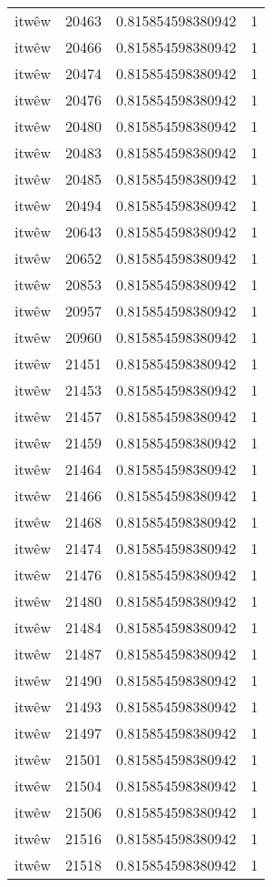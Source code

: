 \begin{longtable}{llll}
itwêw & 20463 & 0.815854598380942 & 1 \\
itwêw & 20466 & 0.815854598380942 & 1 \\
itwêw & 20474 & 0.815854598380942 & 1 \\
itwêw & 20476 & 0.815854598380942 & 1 \\
itwêw & 20480 & 0.815854598380942 & 1 \\
itwêw & 20483 & 0.815854598380942 & 1 \\
itwêw & 20485 & 0.815854598380942 & 1 \\
itwêw & 20494 & 0.815854598380942 & 1 \\
itwêw & 20643 & 0.815854598380942 & 1 \\
itwêw & 20652 & 0.815854598380942 & 1 \\
itwêw & 20853 & 0.815854598380942 & 1 \\
itwêw & 20957 & 0.815854598380942 & 1 \\
itwêw & 20960 & 0.815854598380942 & 1 \\
itwêw & 21451 & 0.815854598380942 & 1 \\
itwêw & 21453 & 0.815854598380942 & 1 \\
itwêw & 21457 & 0.815854598380942 & 1 \\
itwêw & 21459 & 0.815854598380942 & 1 \\
itwêw & 21464 & 0.815854598380942 & 1 \\
itwêw & 21466 & 0.815854598380942 & 1 \\
itwêw & 21468 & 0.815854598380942 & 1 \\
itwêw & 21474 & 0.815854598380942 & 1 \\
itwêw & 21476 & 0.815854598380942 & 1 \\
itwêw & 21480 & 0.815854598380942 & 1 \\
itwêw & 21484 & 0.815854598380942 & 1 \\
itwêw & 21487 & 0.815854598380942 & 1 \\
itwêw & 21490 & 0.815854598380942 & 1 \\
itwêw & 21493 & 0.815854598380942 & 1 \\
itwêw & 21497 & 0.815854598380942 & 1 \\
itwêw & 21501 & 0.815854598380942 & 1 \\
itwêw & 21504 & 0.815854598380942 & 1 \\
itwêw & 21506 & 0.815854598380942 & 1 \\
itwêw & 21516 & 0.815854598380942 & 1 \\
itwêw & 21518 & 0.815854598380942 & 1 \\

\end{longtable}
